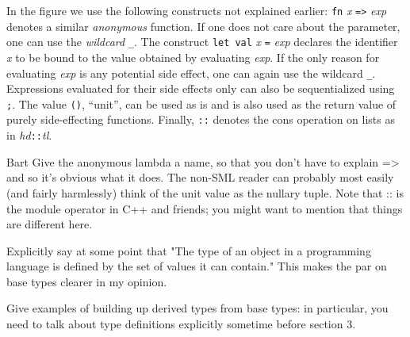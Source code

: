\documentclass[workingdraft]{usetex-v1}
\begin{document}
In the figure we use the following \sml constructs not explained
earlier: \texttt{fn}
\textit{x} \texttt{=>} \textit{exp} denotes a similar \emph{anonymous}
function. If one does not care about the parameter, one can use the
\emph{wildcard} \texttt{\_}. The construct \texttt{let}~\texttt{val}
\textit{x} \texttt{=} \textit{exp} declares the identifier \textit{x}
to be bound to the value obtained by evaluating \textit{exp}. If the
only reason for evaluating \textit{exp} is any potential side effect,
one can again use the wildcard \texttt{\_}. Expressions evaluated for
their side effects only can also be sequentialized using \texttt{;}.
The value \texttt{()}, ``unit'', can be used as is and is also used as
the return value of purely side-effecting functions.  Finally,
\texttt{::} denotes the cons operation on lists as in
\textit{hd}\texttt{::}\textit{tl}.


\begin{ednote}{Bart}
     Give the anonymous lambda a name, so that you don't have to explain
   => and so it's obvious what it does.  The non-SML reader can probably
   most easily (and fairly harmlessly) think of the unit value as the
   nullary tuple.  Note that :: is the module operator in C++ and
   friends; you might want to mention that things are different here.

   Explicitly say at some point that "The type of an object in
   a programming language is defined by the set of values it
   can contain."  This makes the par on base types clearer in
   my opinion.

   Give examples of building up derived types from base types:
   in particular, you need to talk about type definitions
   explicitly sometime before section 3.

\end{ednote}


\end{document}
